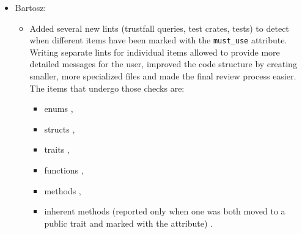\documentclass[licencjacka,en]{pracamgr}
\begin{document}
\begin{itemize}
\begin{itemize}
		\end{itemize}

	\item Bartosz:
		\begin{itemize}



			\item Added several new lints (trustfall queries, test crates, tests)
				to detect when different items have been marked with the \texttt{must\_use}
				attribute. Writing separate lints for individual items allowed to provide more
				detailed messages for the user, improved the code structure by creating smaller,
				more specialized files and made the final review process easier. The items that
				undergo those checks are:
				\begin{itemize}
					\item enums \cite{pr_lint_enum_must_use_added},
					\item structs \cite{pr_lint_struct_must_use_added},
					\item traits \cite{pr_lint_trait_must_use_added},
					\item functions \cite{pr_lint_function_must_use_added},
					\item methods \cite{pr_method_moved_to_trait_must_use_added},
					\item inherent methods (reported only when one was both moved to
						a public trait and marked with the attribute)
						\cite{pr_inherent_method_must_use_added}.
				\end{itemize}


\end{itemize}
\end{itemize}
\end{document}

